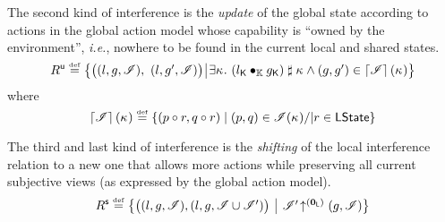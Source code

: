 The second kind of interference is the \emph{update} of the global state according to actions in the global action model whose capability is ``owned by the environment'', \textit{i.e.}, nowhere to be found in the current local and shared states.
%
\[	
  \updateR \eqdef
  \left\{
  \begin{array}{@{} l @{\hspace*{2pt}} | @{\hspace*{2pt}} r @{}}
    \left(
    \begin{array}{@{} l @{}}
      (l, g, \lmod),\ 
      (l, g', \lmod)
    \end{array}
    \right)
    &
    \begin{array}{@{} l @{} }
      \begin{array}{@{} l @{}}
	\exsts{\ca{} }\left( \capPart{l} \composeCap \capPart{g} \right) \compatible \ca{} \land 
	(g, g') \in \padAM{\lmod}(\ca{}) \\
      \end{array}	
    \end{array}
  \end{array}
  \right\}
\]	
%
where
%
\[
\left\lceil \mathscr{I}\right\rceil(\kappa_{}) \mathrel{\stackrel{\smash{\scriptscriptstyle{\mathrm{def}}}}{=}} \left\{ (p \circ r, q \circ r) \mid (p, q) \in \mathscr{I}(\kappa_{}) /| r \in \textsf{LState} \right\}
\]
%

The third and last kind of interference is the \emph{shifting} of the local interference relation to a new one that allows more actions while preserving all current subjective views (as expressed by the global action model).
%
\[
  \shiftR \eqdef
  \left\{
  \begin{array}{@{} l @{\hspace*{5pt}} | @{\hspace*{5pt}} r @{}}
    \left(
    \begin{array}{@{} l @{}}
      (l, g, \lmod),
      \left( l, g, \lmod \cup \lmod' \right)
    \end{array}
    \right)
    &
    \expandsAM{\lmod'}{\unitL}{g}{\lmod}
  \end{array}
  \right\}
\]


